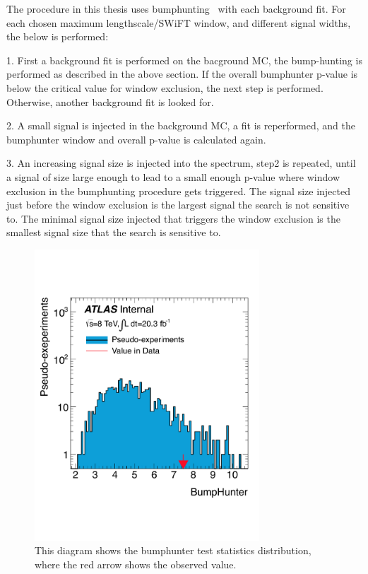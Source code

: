     The procedure in this thesis uses bumphunting~\cite{choudalakis2011hypothesis} with each background fit.
   For each chosen maximum lengthscale/SWiFT window, and different signal widths, the below is performed:

   1. First a background fit is performed on the bacground MC, the bump-hunting is performed as described in the above section. If the overall bumphunter p-value is below the critical value for window exclusion, the next step is performed. Otherwise, another background fit is looked for.

   2. A small signal is injected in the background MC, a fit is reperformed, and the bumphunter window and overall p-value is calculated again. 

   3. An increasing signal size is injected into the spectrum, step2 is repeated, until a signal of size large enough to lead to a small enough p-value where window exclusion in the bumphunting procedure gets triggered. The signal size injected just before the window exclusion is the largest signal the search is not sensitive to. The minimal signal size injected that triggers the window exclusion is the smallest signal size that the search is sensitive to. 

\begin{figure}[!htb]
    \begin{center}
        \includegraphics[width=0.75\textwidth]{figures/chapter_analysismethod/bumphunter}
        \caption{
            This diagram shows the bumphunter test statistics distribution, where the red arrow shows the observed value. 
        }
        \label{fig:swift}
    \end{center}
\end{figure}
\FloatBarrier
   
